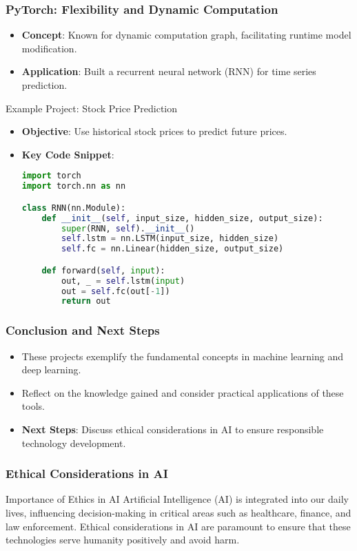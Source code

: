 \documentclass{beamer}
\begin{document}
\begin{frame}[fragile]
    \frametitle{PyTorch: Flexibility and Dynamic Computation}
    \begin{itemize}
        \item \textbf{Concept}: Known for dynamic computation graph, facilitating runtime model modification.
        \item \textbf{Application}: Built a recurrent neural network (RNN) for time series prediction.
    \end{itemize}

    \begin{block}{Example Project: Stock Price Prediction}
        \begin{itemize}
            \item \textbf{Objective}: Use historical stock prices to predict future prices.
            \item \textbf{Key Code Snippet}:
            \begin{lstlisting}[language=Python]
import torch
import torch.nn as nn

class RNN(nn.Module):
    def __init__(self, input_size, hidden_size, output_size):
        super(RNN, self).__init__()
        self.lstm = nn.LSTM(input_size, hidden_size)
        self.fc = nn.Linear(hidden_size, output_size)

    def forward(self, input):
        out, _ = self.lstm(input)
        out = self.fc(out[-1])
        return out
            \end{lstlisting}
        \end{itemize}
    \end{block}
\end{frame}

\begin{frame}
    \frametitle{Conclusion and Next Steps}
    \begin{itemize}
        \item These projects exemplify the fundamental concepts in machine learning and deep learning.
        \item Reflect on the knowledge gained and consider practical applications of these tools.
        \item \textbf{Next Steps}: Discuss ethical considerations in AI to ensure responsible technology development.
    \end{itemize}
\end{frame}

\begin{frame}[fragile]
    \frametitle{Ethical Considerations in AI}
    \begin{block}{Importance of Ethics in AI}
        Artificial Intelligence (AI) is integrated into our daily lives, influencing decision-making in critical areas such as healthcare, finance, and law enforcement. Ethical considerations in AI are paramount to ensure that these technologies serve humanity positively and avoid harm.
    \end{block}
\end{frame}
\end{document}
